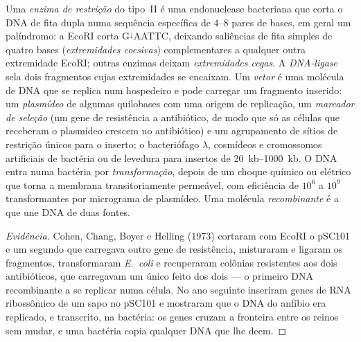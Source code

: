 \begin{definition}\label{def:b3:genetic-engineering:tools}
Uma \emph{enzima de restrição} do tipo~II é uma endonuclease bacteriana
que corta o DNA de fita dupla numa sequência específica de
\numrange{4}{8} pares de bases, em geral um palíndromo: a EcoRI corta
G$^{\downarrow}$AATTC, deixando saliências de fita simples de quatro
bases (\emph{extremidades coesivas}) complementares a qualquer outra
extremidade EcoRI; outras enzimas deixam \emph{extremidades cegas}. A
\emph{DNA-ligase} sela dois fragmentos cujas extremidades se encaixam.
Um \emph{vetor} é uma molécula de DNA que se replica num hospedeiro e
pode carregar um fragmento inserido: um \emph{plasmídeo} de algumas
quilobases com uma origem de replicação, um \emph{marcador de seleção}
(um gene de resistência a antibiótico, de modo que só as células que
receberam o plasmídeo crescem no antibiótico) e um agrupamento de
sítios de restrição únicos para o inserto; o bacteriófago $\lambda$,
cosmídeos e cromossomos artificiais de bactéria ou de levedura para
insertos de \qtyrange{20}{1000}{kb}. O DNA entra numa bactéria por
\emph{transformação}, depois de um choque químico ou elétrico que torna
a membrana transitoriamente permeável, com eficiência de $10^{6}$ a
$10^{9}$ transformantes por micrograma de plasmídeo. Uma molécula
\emph{recombinante} é a que une DNA de duas fontes.
\end{definition}

\begin{proof}[Evidência]
Cohen, Chang, Boyer e Helling (1973) cortaram com EcoRI o 
pSC101 e um segundo  que carregava outro gene de resistência,
misturaram e ligaram os fragmentos, transformaram \emph{E.~coli} e
recuperaram colônias resistentes aos dois antibióticos, que carregavam
um único  feito dos dois --- o primeiro DNA recombinante a se
replicar numa célula. No ano seguinte inseriram genes de RNA
ribossômico de um sapo no pSC101 e mostraram que o DNA do anfíbio era
replicado, e transcrito, na bactéria: os genes cruzam a fronteira entre
os reinos sem mudar, e uma bactéria copia qualquer DNA que lhe deem.
\end{proof}

